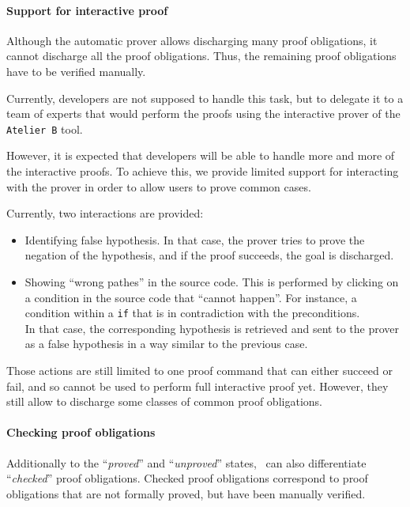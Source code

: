 \paragraph{Support for interactive proof}
Although the automatic prover allows discharging many proof
obligations, it cannot discharge all the proof obligations. Thus, the
remaining proof obligations have to be verified manually.

Currently, developers are not supposed to handle this task, but to
delegate it to a team of experts that would perform the proofs using
the interactive prover of the \texttt{Atelier B} tool.

However, it is expected that developers will be able to handle more
and more of the interactive proofs. To achieve this, we provide
limited support for interacting with the prover in order to allow
users to prove common cases.

Currently, two interactions are provided:
\begin{itemize}
\item Identifying false hypothesis. In that case, the prover tries to
    prove the negation of the hypothesis, and if the proof succeeds,
    the goal is discharged.
\item Showing ``wrong pathes'' in the source code. This is performed
    by clicking on a condition in the source code that ``cannot
    happen''. For instance, a condition within a {\tt if} that is in
    contradiction with the preconditions. \\ In that case, the
    corresponding hypothesis is retrieved and sent to the prover as a
    false hypothesis in a way similar to the previous case.
\end{itemize}
Those actions are still limited to one proof command that can either
succeed or fail, and so cannot be used to perform full interactive
proof yet.
However, they still allow to discharge some classes of common  proof
obligations.
\paragraph{Checking proof obligations}
Additionally to the ``\textit{proved}'' and ``\textit{unproved}''
states, \JACK\ can also differentiate ``\textit{checked}'' proof
obligations. Checked proof obligations correspond to proof obligations
that are not formally proved, but have been manually verified.


